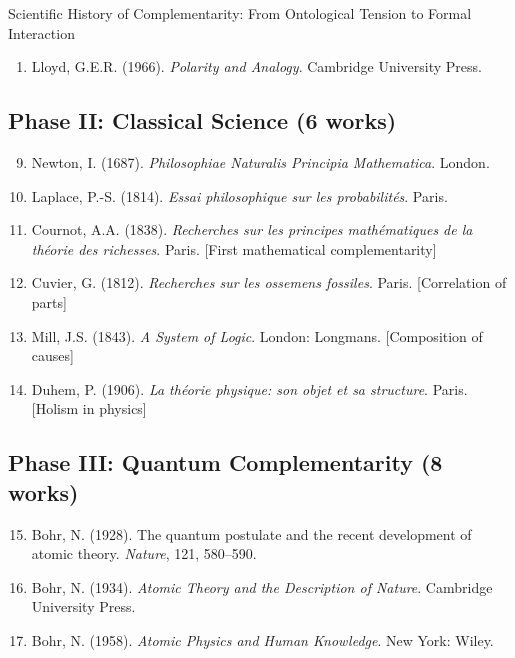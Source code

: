 \begin{chapter}{Scientific History of Complementarity: From Ontological Tension to Formal Interaction}
\begin{enumerate}
    \item Lloyd, G.E.R. (1966). \textit{Polarity and Analogy}. Cambridge University Press.
\end{enumerate}

\subsection{Phase II: Classical Science (6 works)}

\begin{enumerate}
    \setcounter{enumi}{8}
    \item Newton, I. (1687). \textit{Philosophiae Naturalis Principia Mathematica}. London.

    \item Laplace, P.-S. (1814). \textit{Essai philosophique sur les probabilités}. Paris.

    \item Cournot, A.A. (1838). \textit{Recherches sur les principes mathématiques de la théorie des richesses}. Paris. [First mathematical complementarity]

    \item Cuvier, G. (1812). \textit{Recherches sur les ossemens fossiles}. Paris. [Correlation of parts]

    \item Mill, J.S. (1843). \textit{A System of Logic}. London: Longmans. [Composition of causes]

    \item Duhem, P. (1906). \textit{La théorie physique: son objet et sa structure}. Paris. [Holism in physics]
\end{enumerate}

\subsection{Phase III: Quantum Complementarity (8 works)}

\begin{enumerate}
    \setcounter{enumi}{14}
    \item Bohr, N. (1928). The quantum postulate and the recent development of atomic theory. \textit{Nature}, 121, 580--590.

    \item Bohr, N. (1934). \textit{Atomic Theory and the Description of Nature}. Cambridge University Press.

    \item Bohr, N. (1958). \textit{Atomic Physics and Human Knowledge}. New York: Wiley.


\end{enumerate}
\end{chapter}
